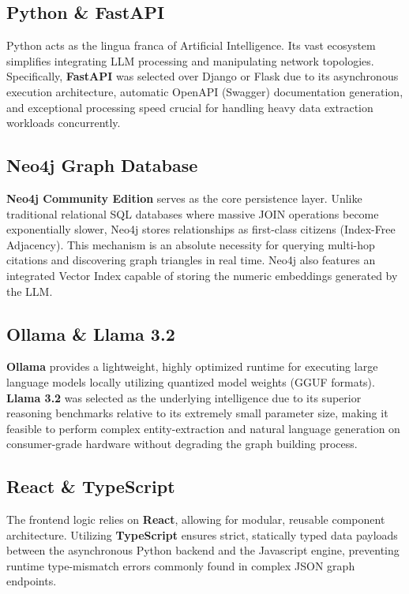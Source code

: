 \documentclass[12pt,a4paper]{report}
\begin{document}
\subsection{Python \& FastAPI}
Python acts as the lingua franca of Artificial Intelligence. Its vast ecosystem simplifies integrating LLM processing and manipulating network topologies. Specifically, \textbf{FastAPI} was selected over Django or Flask due to its asynchronous execution architecture, automatic OpenAPI (Swagger) documentation generation, and exceptional processing speed crucial for handling heavy data extraction workloads concurrently.

\subsection{Neo4j Graph Database}
\textbf{Neo4j Community Edition} serves as the core persistence layer. Unlike traditional relational SQL databases where massive JOIN operations become exponentially slower, Neo4j stores relationships as first-class citizens (Index-Free Adjacency). This mechanism is an absolute necessity for querying multi-hop citations and discovering graph triangles in real time. Neo4j also features an integrated Vector Index capable of storing the numeric embeddings generated by the LLM.

\subsection{Ollama \& Llama 3.2}
\textbf{Ollama} provides a lightweight, highly optimized runtime for executing large language models locally utilizing quantized model weights (GGUF formats). \textbf{Llama 3.2} was selected as the underlying intelligence due to its superior reasoning benchmarks relative to its extremely small parameter size, making it feasible to perform complex entity-extraction and natural language generation on consumer-grade hardware without degrading the graph building process.

\subsection{React \& TypeScript}
The frontend logic relies on \textbf{React}, allowing for modular, reusable component architecture. Utilizing \textbf{TypeScript} ensures strict, statically typed data payloads between the asynchronous Python backend and the Javascript engine, preventing runtime type-mismatch errors commonly found in complex JSON graph endpoints.
\end{document}
